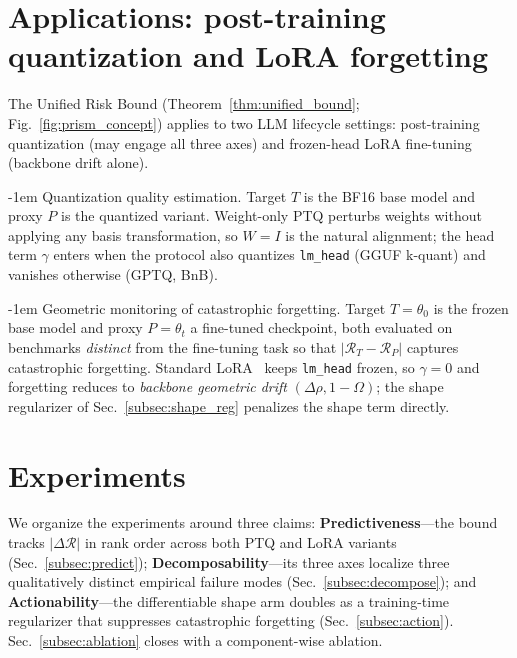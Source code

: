 \documentclass{article} %
\makeatletter
\newlength{\paraSpace}
\renewcommand{\paragraph}{\@startsection{paragraph}{4}{\z@}%
  {\paraSpace}{-1em}%
  {\normalfont\normalsize\bfseries}}
\makeatother
\begin{document}
\section{Applications: post-training quantization and LoRA forgetting}
\label{sec:applications}

The Unified Risk Bound (Theorem~\ref{thm:unified_bound}; Fig.~\ref{fig:prism_concept}) applies to two LLM lifecycle settings: post-training quantization (may engage all three axes) and frozen-head LoRA fine-tuning (backbone drift alone).

\paragraph{Quantization quality estimation.}
\label{subsec:quantization}
Target $T$ is the BF16 base model and proxy $P$ is the quantized variant. Weight-only PTQ perturbs weights without applying any basis transformation, so $W{=}I$ is the natural alignment; the head term $\gamma$ enters when the protocol also quantizes \texttt{lm\_head} (GGUF k-quant) and vanishes otherwise (GPTQ, BnB).

\paragraph{Geometric monitoring of catastrophic forgetting.}
\label{subsec:forgetting}
Target $T{=}\theta_0$ is the frozen base model and proxy $P{=}\theta_t$ a fine-tuned checkpoint, both evaluated on benchmarks \emph{distinct} from the fine-tuning task so that $|\mathcal{R}_T - \mathcal{R}_P|$ captures catastrophic forgetting. Standard LoRA~\citep{hu2022lora} keeps \texttt{lm\_head} frozen, so $\gamma{=}0$ and forgetting reduces to \emph{backbone geometric drift} $(\Delta\rho, 1{-}\Omega)$; the shape regularizer of Sec.~\ref{subsec:shape_reg} penalizes the shape term directly.


\section{Experiments}
\label{sec:experiments}

We organize the experiments around three claims: \textbf{Predictiveness}---the bound tracks $|\Delta\mathcal{R}|$ in rank order across both PTQ and LoRA variants (Sec.~\ref{subsec:predict}); \textbf{Decomposability}---its three axes localize three qualitatively distinct empirical failure modes (Sec.~\ref{subsec:decompose}); and \textbf{Actionability}---the differentiable shape arm doubles as a training-time regularizer that suppresses catastrophic forgetting (Sec.~\ref{subsec:action}). Sec.~\ref{subsec:ablation} closes with a component-wise ablation.
\end{document}
